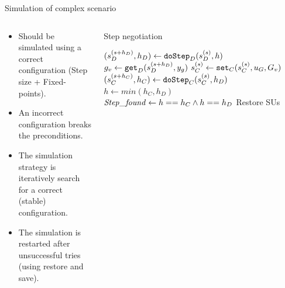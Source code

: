 \documentclass{beamer}
\begin{document}
\begin{frame}{Simulation of complex scenario}
    \begin{columns}
        \begin{column}[]{0.5\textwidth}
            \begin{itemize}
                \item Should be simulated using a correct configuration (Step size + Fixed-points).
                \item An incorrect configuration breaks the preconditions.
                \item The simulation strategy is iteratively search for a correct (stable) configuration.
                \item The simulation is restarted after unsuccessful tries (using restore and save).
            \end{itemize}
        \end{column}
        \begin{column}[]{0.5\textwidth}
            \begin{algorithm}[H]
                \caption{Step negotiation}
            \label{alg:algorithm_step}
            \begin{algorithmic}[1]
              \scriptsize
                \While{$!\stepfound$} 
                \State $(s_{D}^{(s+h_D)},h_D) \gets \mathtt{doStep}_{D}(s_{D}^{(s)}, h)$
                \State $g_v \gets \mathtt{get}_{D}(s_{D}^{(s+h_D)}, y_{g})$       
                \State $s_{C}^{(s)} \gets \mathtt{set}_{C}(s_{C}^{(s)}, u_{G}, G_v)$
                \State $(s_{C}^{(s+h_C)},h_C) \gets \mathtt{doStep}_{C}(s_{C}^{(s)}, h_D)$
                \State $h \gets min(h_C, h_D)$
                \State $\mathit{Step\_found} \gets h == h_C \land h == h_D$
                \If{$!\stepfound$}
                    \State Restore SUs
                \EndIf
                \EndWhile
            \end{algorithmic} 
          \end{algorithm}
        \end{column}
    \end{columns}    
\end{frame}
\end{document}
